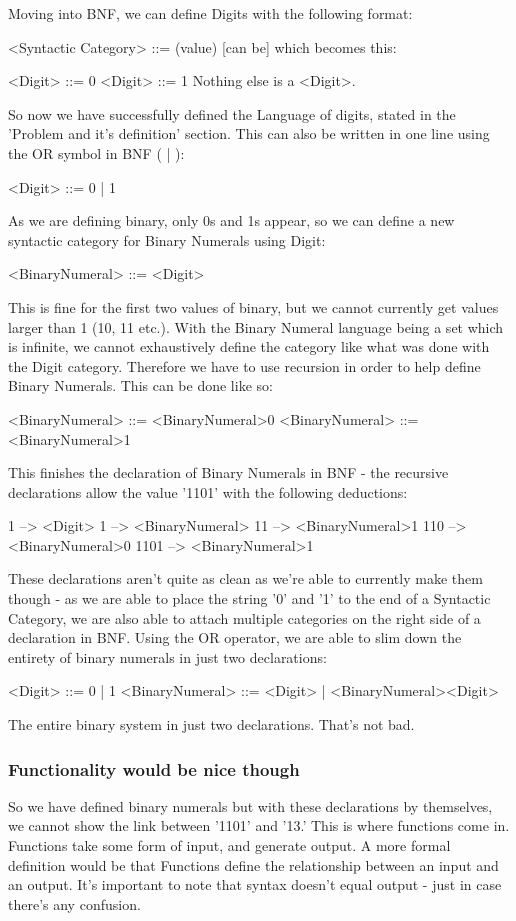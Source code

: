 \documentclass[12pt]{article}
\begin{document}
Moving into BNF, we can define Digits with the following format:

<Syntactic Category> ::= (value)
                   [can be]
which becomes this:

<Digit> ::= 0
<Digit> ::= 1
Nothing else is a <Digit>.

So now we have successfully defined the Language of digits, stated in the
'Problem and it's definition' section.  This can also be written in one line
using the OR symbol in BNF ( | ):

<Digit> ::= 0 | 1

As we are defining binary, only 0s and 1s appear, so we can define a new
syntactic category for Binary Numerals using Digit:

<BinaryNumeral> ::= <Digit>

This is fine for the first two values of binary, but we cannot currently get
values larger than 1 (10, 11 etc.).  With the Binary Numeral language being a
set which is infinite, we cannot exhaustively define the category like what
was done with the Digit category.  Therefore we have to use recursion in order
to help define Binary Numerals.  This can be done like so:

<BinaryNumeral> ::= <BinaryNumeral>0
<BinaryNumeral> ::= <BinaryNumeral>1

This finishes the declaration of Binary Numerals in BNF - the recursive
declarations allow the value '1101' with the following deductions:

1    --> <Digit>
1    --> <BinaryNumeral>
11   --> <BinaryNumeral>1
110  --> <BinaryNumeral>0
1101 --> <BinaryNumeral>1

These declarations aren't quite as clean as we're able to currently make them
though - as we are able to place the string '0' and '1' to the end of a
Syntactic Category, we are also able to attach multiple categories on the right
side of a declaration in BNF.  Using the OR operator, we are able to slim down
the entirety of binary numerals in just two declarations:

<Digit> ::= 0 | 1
<BinaryNumeral> ::= <Digit> | <BinaryNumeral><Digit>

The entire binary system in just two declarations.  That's not bad.

\subsubsection{Functionality would be nice though}
\label{sec-2-3-4}
So we have defined binary numerals but with these declarations by themselves,
we cannot show the link between '1101' and '13.'  This is where functions come
in.  Functions take some form of input, and generate output.  A more formal
definition would be that Functions define the relationship between an input and
an output.  It's important to note that syntax doesn't equal output - just in
case there's any confusion.
\end{document}
